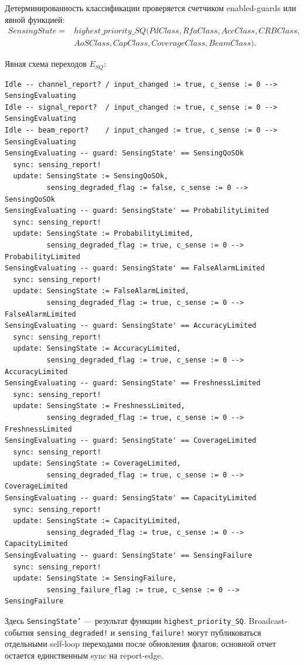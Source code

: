 \documentclass[10pt,a4paper]{article}
\newcommand{\code}[1]{\texttt{#1}}
\begin{document}
Детерминированность классификации проверяется счетчиком enabled-guards или явной функцией:
\begin{equation}
\begin{aligned}
SensingState={}&highest\_priority\_SQ(PdClass,RfaClass,AccClass,CRBClass,\\
&AoSClass,CapClass,CoverageClass,BeamClass).
\end{aligned}
\end{equation}

Явная схема переходов \(E_{SQ}\):
\begin{verbatim}
Idle -- channel_report? / input_changed := true, c_sense := 0 --> SensingEvaluating
Idle -- signal_report?  / input_changed := true, c_sense := 0 --> SensingEvaluating
Idle -- beam_report?    / input_changed := true, c_sense := 0 --> SensingEvaluating
SensingEvaluating -- guard: SensingState' == SensingQoSOk
  sync: sensing_report!
  update: SensingState := SensingQoSOk,
          sensing_degraded_flag := false, c_sense := 0 --> SensingQoSOk
SensingEvaluating -- guard: SensingState' == ProbabilityLimited
  sync: sensing_report!
  update: SensingState := ProbabilityLimited,
          sensing_degraded_flag := true, c_sense := 0 --> ProbabilityLimited
SensingEvaluating -- guard: SensingState' == FalseAlarmLimited
  sync: sensing_report!
  update: SensingState := FalseAlarmLimited,
          sensing_degraded_flag := true, c_sense := 0 --> FalseAlarmLimited
SensingEvaluating -- guard: SensingState' == AccuracyLimited
  sync: sensing_report!
  update: SensingState := AccuracyLimited,
          sensing_degraded_flag := true, c_sense := 0 --> AccuracyLimited
SensingEvaluating -- guard: SensingState' == FreshnessLimited
  sync: sensing_report!
  update: SensingState := FreshnessLimited,
          sensing_degraded_flag := true, c_sense := 0 --> FreshnessLimited
SensingEvaluating -- guard: SensingState' == CoverageLimited
  sync: sensing_report!
  update: SensingState := CoverageLimited,
          sensing_degraded_flag := true, c_sense := 0 --> CoverageLimited
SensingEvaluating -- guard: SensingState' == CapacityLimited
  sync: sensing_report!
  update: SensingState := CapacityLimited,
          sensing_degraded_flag := true, c_sense := 0 --> CapacityLimited
SensingEvaluating -- guard: SensingState' == SensingFailure
  sync: sensing_report!
  update: SensingState := SensingFailure,
          sensing_failure_flag := true, c_sense := 0 --> SensingFailure
\end{verbatim}
Здесь \code{SensingState'} --- результат функции \code{highest\_priority\_SQ}. Broadcast-события \code{sensing\_degraded!} и \code{sensing\_failure!} могут публиковаться отдельными self-loop переходами после обновления флагов; основной отчет остается единственным sync на report-edge.
\end{document}
